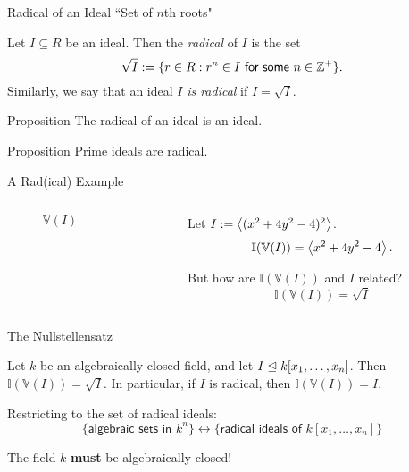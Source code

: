\documentclass{beamer}
\newcommand{\V}{\mathbb V}
\newcommand{\I}{\mathbb I}
\begin{document}
\begin{frame}{Radical of an Ideal}
``Set of $n$th roots" \pause
\begin{definition}
Let $I\subseteq R$ be an ideal. Then the \textit{radical} of $I$ is the set
$$\sqrt I:= \{r\in R: r^n\in I \textsf{ for some } n\in\mathbb Z^+\}.$$
Similarly, we say that an ideal $I$ \textit{is radical} if $I = \sqrt I$.
\end{definition}\pause
\begin{block}{Proposition}
The radical of an ideal is an ideal.
\end{block}
\begin{block}{Proposition}
Prime ideals are radical.
\end{block}
\end{frame}
\begin{frame}{A Rad(ical) Example}
\begin{columns}
\begin{column}{0.48\textwidth}
\begin{figure}[h!]
\centering
{}
\caption{$\V(I)$}
\end{figure}
\end{column}
\begin{column}{0.48\textwidth}
Let $I:= \left\langle(x^2+4y^2-4)^2\right\rangle$.
$$\I(\V(I)) = \gen{x^2+4y^2-4}.$$ \pause

But how are $\I(\V(I))$ and $I$ related? \pause
$$\boxed{\I(\V(I)) = \sqrt I}$$
\end{column}
\end{columns}
\end{frame}
\begin{frame}{The Nullstellensatz}
\begin{theorem}
Let $k$ be an algebraically closed field, and let $I\trianglelefteq k[x_1,\ldots, x_n]$. Then $\I(\V(I)) = \sqrt I$. In particular, if $I$ is radical, then $\I(\V(I)) = I$.
\end{theorem}\pause
Restricting to the set of radical ideals:
$$\Big\{\textsf{algebraic sets in } k^n\Big\} \longleftrightarrow \Big\{\textsf{radical ideals of } k[x_1,\ldots, x_n]\Big\}$$\pause

The field $k$ \textbf{must} be algebraically closed!
\end{frame}
\end{document}
